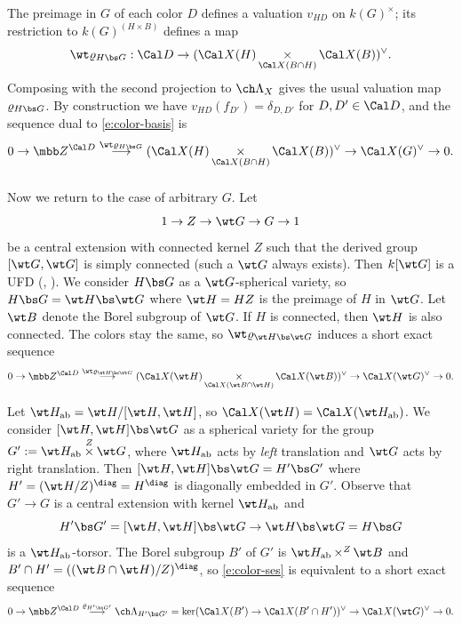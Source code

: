 \documentclass[final]{amsart}
\theoremstyle{remark}
\theoremstyle{definition}
\DeclareMathOperator*{\xt}{\times}
\numberwithin{equation}{section}
\begin{document}
The preimage in $G$ of each color $D$ defines a valuation $v_{HD}$ on $k(G)^\times$; its restriction to $k(G)^{(H\xt B)}$ defines a map
\[ 
    \wt\varrho_{H\bs G} : \Cal D \to (\Cal X(H) \xt_{\Cal X(B\cap H)} \Cal X(B))^\vee. 
\]
Composing with the second projection to $\ch\Lambda_X$ gives the usual
valuation map $\varrho_{H\bs G}$.
By construction we have $v_{HD}(f_{D'}) = \delta_{D,D'}$ 
for $D,D'\in \Cal D$, and the sequence dual to \eqref{e:color-basis} is 
\[ 
    0\to \mbb Z^{\Cal D} \overset{\wt\varrho_{H\bs G}}\longrightarrow 
(\Cal X(H) \xt_{\Cal X(B\cap H)} \Cal X(B))^\vee \to 
\Cal X(G)^\vee \to 0.
\]

\subsubsection{} \label{sect:Xcover}
Now we return to the case of arbitrary $G$. Let 
\[ 1 \to Z \to \wt G \to G \to 1 \] 
be a central extension with connected 
kernel $Z$ such that the derived group $[\wt G, \wt G]$ is simply
connected (such a $\wt G$ always exists). 
Then $k[\wt G]$ is a UFD (\cite[Proposition 4.6]{KKLV}, \cite{Iv}).
We consider $H\bs G$ as a $\wt G$-spherical variety, so 
$H\bs G = \wt H \bs \wt G$ where $\wt H = HZ$ is the preimage of $H$
in $\wt G$. Let $\wt B$ denote the Borel subgroup of $\wt G$.
If $H$ is connected, then $\wt H$ is also connected.
The colors stay the same, so 
$\wt\varrho_{\wt H\bs \wt G}$ induces a short exact sequence
\begin{equation} \label{e:color-ses} 
0 \to \mbb Z^{\Cal D} \overset{\wt\varrho_{\wt H\bs \wt G}}\longrightarrow 
(\Cal X(\wt H) \xt_{\Cal X(\wt B\cap \wt H)} \Cal X(\wt B))^\vee \to 
\Cal X(\wt G)^\vee \to 0.
\end{equation}

\smallskip

Let $\wt H_{\mathrm{ab}} = \wt H/[\wt H,\wt H]$, so 
$\Cal X(\wt H) = \Cal X(\wt H_{\mathrm{ab}})$. 
We consider $[\wt H,\wt H] \bs \wt G$ 
as a spherical variety for the group $G' := \wt H_{\mathrm{ab}} \overset Z\times \wt G$,
where $\wt H_{\mathrm{ab}}$ acts by \emph{left} translation and 
$\wt G$ acts by right translation. 
Then 
$[\wt H,\wt H] \bs \wt G = H' \bs G'$ 
where $H'=(\wt H/Z)^\diag=H^\diag$ is diagonally embedded in $G'$. 
Observe that $G' \to G$ is a central extension
with kernel $\wt H_{\mathrm{ab}}$
and 
\[ H'\bs G' = [\wt H,\wt H]\bs \wt G \to \wt H \bs \wt G = H\bs G \]
is a $\wt H_{\mathrm{ab}}$-torsor. 
The Borel subgroup $B'$ of $G'$ is $\wt H_{\mathrm{ab}} \xt^Z \wt B$
and $B'\cap H' = ((\wt B \cap \wt H)/Z)^\diag$, so 
 \eqref{e:color-ses} is equivalent to a short exact sequence
\[ 
    0 \to \mbb Z^{\Cal D} \overset{\varrho_{H'\bs G'}}\longrightarrow
    \ch\Lambda_{H'\bs G'} = \ker(\Cal X(B')\to \Cal X(B'\cap H'))^\vee 
    \to \Cal X(\wt G)^\vee \to 0. 
\]
\end{document}
